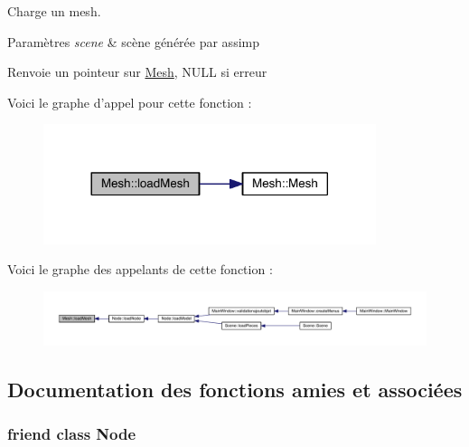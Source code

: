 Charge un mesh. 


\begin{DoxyParams}{Paramètres}
{\em scene} & scène générée par assimp\\
\hline
\end{DoxyParams}
\begin{DoxyReturn}{Renvoie}
un pointeur sur \hyperlink{class_mesh}{Mesh}, N\+U\+L\+L si erreur 
\end{DoxyReturn}


Voici le graphe d'appel pour cette fonction \+:
\nopagebreak
\begin{figure}[H]
\begin{center}
\leavevmode
\includegraphics[width=276pt]{class_mesh_a7b405216bda9e94d64aa8a308d718cb4_cgraph}
\end{center}
\end{figure}




Voici le graphe des appelants de cette fonction \+:
\nopagebreak
\begin{figure}[H]
\begin{center}
\leavevmode
\includegraphics[width=350pt]{class_mesh_a7b405216bda9e94d64aa8a308d718cb4_icgraph}
\end{center}
\end{figure}




\subsection{Documentation des fonctions amies et associées}
\hypertarget{class_mesh_a6db9d28bd448a131448276ee03de1e6d}{
\subsubsection[{Node}]{\setlength{\rightskip}{0pt plus 5cm}friend class {\bf Node}\hspace{0.3cm}{\ttfamily [friend]}}}\label{class_mesh_a6db9d28bd448a131448276ee03de1e6d}


